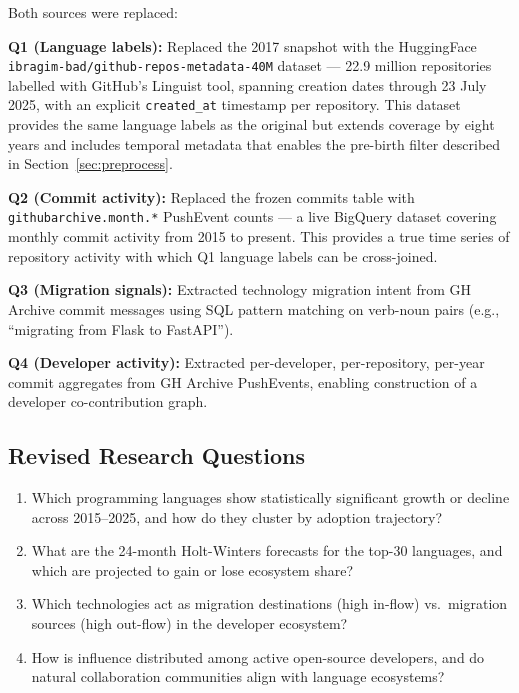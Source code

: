 \documentclass[conference]{IEEEtran}
\begin{document}
Both sources were replaced:

\textbf{Q1 (Language labels):} Replaced the 2017 snapshot with the HuggingFace
\texttt{ibragim-bad/github-repos-metadata-40M} dataset — 22.9 million
repositories labelled with GitHub's Linguist tool, spanning creation dates
through 23 July 2025, with an explicit \texttt{created\_at} timestamp per
repository. This dataset provides the same language labels as the original
but extends coverage by eight years and includes temporal metadata that
enables the pre-birth filter described in Section~\ref{sec:preprocess}.

\textbf{Q2 (Commit activity):} Replaced the frozen commits table with
\texttt{githubarchive.month.*} PushEvent counts — a live BigQuery dataset
covering monthly commit activity from 2015 to present. This provides a
true time series of repository activity with which Q1 language labels can
be cross-joined.

\textbf{Q3 (Migration signals):} Extracted technology migration intent from
GH Archive commit messages using SQL pattern matching on verb-noun pairs
(e.g., ``migrating from Flask to FastAPI'').

\textbf{Q4 (Developer activity):} Extracted per-developer, per-repository,
per-year commit aggregates from GH Archive PushEvents, enabling construction
of a developer co-contribution graph.

\subsection{Revised Research Questions}

\begin{enumerate}
  \item Which programming languages show statistically significant growth or
        decline across 2015--2025, and how do they cluster by adoption trajectory?
  \item What are the 24-month Holt-Winters forecasts for the top-30 languages,
        and which are projected to gain or lose ecosystem share?
  \item Which technologies act as migration destinations (high in-flow) vs.\
        migration sources (high out-flow) in the developer ecosystem?
  \item How is influence distributed among active open-source developers,
        and do natural collaboration communities align with language ecosystems?
\end{enumerate}
\end{document}

